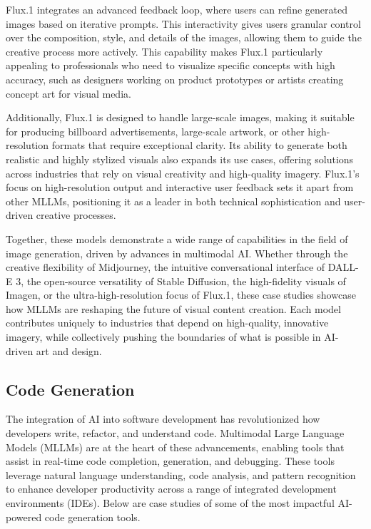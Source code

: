 Flux.1 integrates an advanced feedback loop, where users can refine generated images based on iterative prompts. This interactivity gives users granular control over the composition, style, and details of the images, allowing them to guide the creative process more actively. This capability makes Flux.1 particularly appealing to professionals who need to visualize specific concepts with high accuracy, such as designers working on product prototypes or artists creating concept art for visual media.

Additionally, Flux.1 is designed to handle large-scale images, making it suitable for producing billboard advertisements, large-scale artwork, or other high-resolution formats that require exceptional clarity. Its ability to generate both realistic and highly stylized visuals also expands its use cases, offering solutions across industries that rely on visual creativity and high-quality imagery. Flux.1's focus on high-resolution output and interactive user feedback sets it apart from other MLLMs, positioning it as a leader in both technical sophistication and user-driven creative processes.

Together, these models demonstrate a wide range of capabilities in the field of image generation, driven by advances in multimodal AI. Whether through the creative flexibility of Midjourney, the intuitive conversational interface of DALL-E 3, the open-source versatility of Stable Diffusion, the high-fidelity visuals of Imagen, or the ultra-high-resolution focus of Flux.1, these case studies showcase how MLLMs are reshaping the future of visual content creation. Each model contributes uniquely to industries that depend on high-quality, innovative imagery, while collectively pushing the boundaries of what is possible in AI-driven art and design.

\subsection{Code Generation}

The integration of AI into software development has revolutionized how developers write, refactor, and understand code. Multimodal Large Language Models (MLLMs) are at the heart of these advancements, enabling tools that assist in real-time code completion, generation, and debugging. These tools leverage natural language understanding, code analysis, and pattern recognition to enhance developer productivity across a range of integrated development environments (IDEs). Below are case studies of some of the most impactful AI-powered code generation tools.

